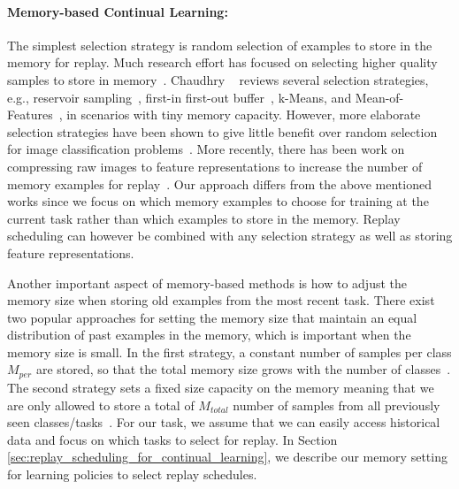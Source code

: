 \paragraph{Memory-based Continual Learning:} The simplest selection strategy is random selection of examples to store in the memory for replay. Much research effort has focused on selecting higher quality samples to store in memory~\cite{chaudhry2019tiny, chrysakis2020online, hayes2019memory, isele2018selective, lopez2017gradient, nguyen2017variational, rebuffi2017icarl}. Chaudhry \etal~\cite{chaudhry2019tiny} reviews several selection strategies, e.g., reservoir sampling~\cite{vitter1985random}, first-in first-out buffer~\cite{lopez2017gradient}, k-Means, and Mean-of-Features~\cite{rebuffi2017icarl}, in scenarios with tiny memory capacity. However, more elaborate selection strategies have been shown to give little benefit over random selection for image classification problems~\cite{chaudhry2018riemannian, hayes2020remind}. More recently, there has been work on compressing raw images to feature representations to increase the number of memory examples for replay~\cite{hayes2020remind, iscen2020memory}. Our approach differs from the above mentioned works since we focus on which memory examples to choose for training at the current task rather than which examples to store in the memory. Replay scheduling can however be combined with any selection strategy as well as storing feature representations. 

Another important aspect of memory-based methods is how to adjust the memory size when storing old examples from the most recent task. There exist two popular approaches for setting the memory size that maintain an equal distribution of past examples in the memory, which is important when the memory size is small. In the first strategy, a constant number of samples per class $M_{per}$ are stored, so that the total memory size grows with the number of classes~\cite{douillard2020podnet, hou2019learning}. The second strategy sets a fixed size capacity on the memory meaning that we are only allowed to store a total of $M_{total}$ number of samples from all previously seen classes/tasks~\cite{chaudhry2019tiny, lopez2017gradient}. For our task, we assume that we can easily access historical data and focus on which tasks to select for replay. In Section \ref{sec:replay_scheduling_for_continual_learning}, we describe our memory setting for learning policies to select replay schedules.


 
\vspace{-2mm}
